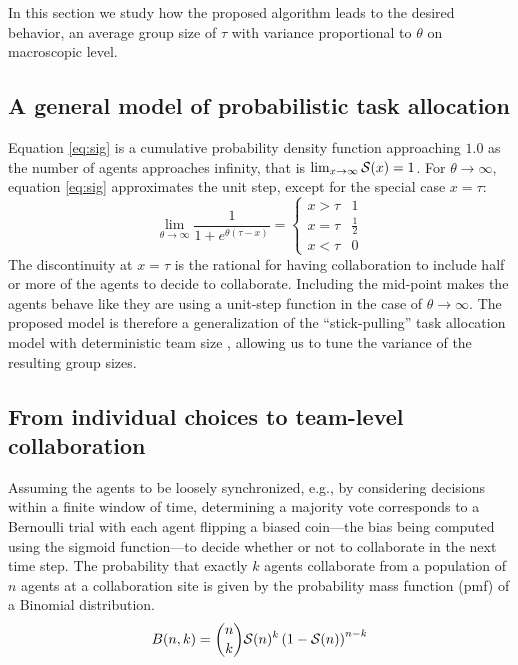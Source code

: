 \documentclass[Main.tex]{subfiles}
\begin{document}
In this section we study how the proposed algorithm leads to the desired behavior, an average group size of $\tau$ with variance proportional to $\theta$ on macroscopic level. 

\subsection*{A general model of probabilistic task allocation}
Equation \eqref{eq:sig} is a cumulative probability density function approaching $1.0$ as the number of agents approaches infinity, that is $\lim_{x \to \infty}\mathcal{S}(x)=1$. For $\theta \to \infty$, equation \eqref{eq:sig} approximates the unit step, except for the special case $x=\tau$:
\begin{equation}
\lim_{\theta \to \infty} \frac{1}{1+e^{\theta(\tau-x)}}=
\left\{
\begin{array}{cc}
 x>\tau & 1\\
 x=\tau	 & \frac{1}{2}\\
 x<\tau & 0
\end{array}
\right.
\end{equation}
The discontinuity at $x=\tau$ is the rational for having collaboration to include half or more of the agents to decide to collaborate. Including the mid-point makes the agents behave like they are using a unit-step function in the case of $\theta \to \infty$. The proposed model is therefore a generalization of the ``stick-pulling'' task allocation model with deterministic team size \cite{Lerman2001}, allowing us to tune the variance of the resulting group sizes. 

\subsection*{From individual choices to team-level collaboration}
Assuming the agents to be loosely synchronized, e.g., by considering decisions within a finite window of time, determining a majority vote corresponds to a Bernoulli trial with each agent flipping a biased coin---the bias being computed using the sigmoid function---to decide whether or not to collaborate in the next time step. The probability that exactly $k$ agents collaborate from a population of $n$ agents at a collaboration site is given by the probability mass function (pmf) of a Binomial distribution.
\begin{equation}
	B(n, k) = \binom{n}{k}\mathcal{S}(n)^{k}\left(1 - \mathcal{S}(n)\right)^{n - k}\label{eq:binomial}
\end{equation}
\end{document}
